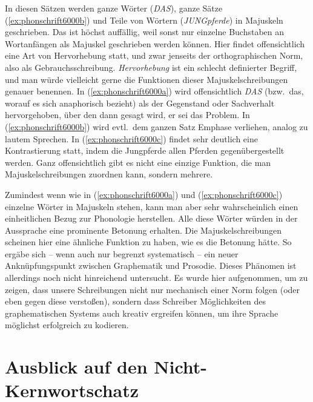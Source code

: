 In diesen Sätzen werden ganze Wörter (\textit{DAS}), ganze Sätze (\ref{ex:phonschrift6000b}) und Teile von Wörtern (\textit{JUNGpferde}) in Majuskeln geschrieben.
Das ist höchst auffällig, weil sonst nur einzelne Buchstaben an Wortanfängen als Majuskel geschrieben werden können.
Hier findet offensichtlich eine Art von Hervorhebung statt, und zwar jenseits der orthographischen Norm, also als Gebrauchsschreibung.
\textit{Hervorhebung} ist ein schlecht definierter Begriff, und man würde vielleicht gerne die Funktionen dieser Majuskelschreibungen genauer benennen.
In (\ref{ex:phonschrift6000a}) wird offensichtlich \textit{DAS} (bzw.\ das, worauf es sich anaphorisch bezieht) als der Gegenstand oder Sachverhalt hervorgehoben, über den dann gesagt wird, er sei das Problem.
In (\ref{ex:phonschrift6000b}) wird evtl.\ dem ganzen Satz Emphase verliehen, analog zu lautem Sprechen.
In (\ref{ex:phonschrift6000c}) findet sehr deutlich eine Kontrastierung statt, indem die Jungpferde allen Pferden gegenübergestellt werden.
Ganz offensichtlich gibt es nicht eine einzige Funktion, die man Majuskelschreibungen zuordnen kann, sondern mehrere.

Zumindest wenn wie in (\ref{ex:phonschrift6000a}) und (\ref{ex:phonschrift6000c}) einzelne Wörter in Majuskeln stehen, kann man aber sehr wahrscheinlich einen einheitlichen Bezug zur Phonologie herstellen.
Alle diese Wörter würden in der Aussprache eine prominente Betonung erhalten.
Die Majuskelschreibungen scheinen hier eine ähnliche Funktion zu haben, wie es die Betonung hätte.
So ergäbe sich -- wenn auch nur begrenzt systematisch -- ein neuer Anknüpfungspunkt zwischen Graphematik und Prosodie.
Dieses Phänomen ist allerdings noch nicht hinreichend untersucht.
Es wurde hier aufgenommen, um zu zeigen, dass unsere Schreibungen nicht nur mechanisch einer Norm folgen (oder eben gegen diese verstoßen), sondern dass Schreiber Möglichkeiten des graphematischen Systems auch kreativ ergreifen können, um ihre Sprache möglichst erfolgreich zu kodieren.




\section{Ausblick auf den Nicht-Kernwortschatz}

